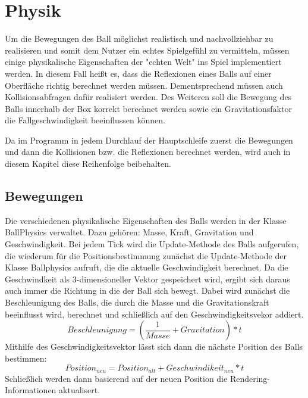 \chapter{Physik}
\label{Kapitel 4}

Um die Bewegungen des Ball möglichst realistisch und nachvollziehbar zu realisieren und somit dem Nutzer ein echtes Spielgefühl zu vermitteln, müssen einige physikalische Eigenschaften der "{}echten Welt"{} ins Spiel implementiert werden. In diesem Fall heißt es, dass die Reflexionen eines Balls auf einer Oberfläche richtig berechnet werden müssen. Dementsprechend müssen auch Kollisionsabfragen dafür realisiert werden. Des Weiteren soll die Bewegung des Balls innerhalb der Box korrekt berechnet werden sowie ein Gravitationsfaktor die Fallgeschwindigkeit beeinflussen können.

Da im Programm in jedem Durchlauf der Hauptschleife zuerst die Bewegungen und dann die Kollisionen bzw. die Reflexionen berechnet werden, wird auch in diesem Kapitel diese Reihenfolge beibehalten.
\section{Bewegungen}
\label{Kapitel_4_-_Unterkapitel_1}
Die verschiedenen physikalische Eigenschaften des Balls werden in der Klasse BallPhysics verwaltet. Dazu gehören: Masse, Kraft, Gravitation und Geschwindigkeit.
Bei jedem Tick wird die Update-Methode des Balls aufgerufen, die wiederum für die Positionsbestimmung zunächst die Update-Methode der Klasse Ballphysics aufruft, die die aktuelle Geschwindigkeit berechnet. Da die Geschwindkeit als 3-dimensioneller Vektor gespeichert wird, ergibt sich daraus auch immer die Richtung in die der Ball sich bewegt. Dabei wird zunächst die Beschleunigung des Balls, die durch die Masse und die Gravitationskraft beeinflusst wird, berechnet und schließlich auf den Geschwindigkeitsvekor addiert.
 \begin{equation}
	    \label{beschleunigung}
	    Beschleunigung = (\frac{1}{Masse} + Gravitation) * t 
    \end{equation}
Mithilfe des Geschwindigkeitsvektor lässt sich dann die nächste Position des Balls bestimmen:
\begin{equation}
	    \label{beschleunigung}
	    Position_{neu} = Position_{alt} + Geschwindikeit_{neu} * t 
    \end{equation}
Schließlich werden dann basierend auf der neuen Position die Rendering-Informationen aktualisert. 


